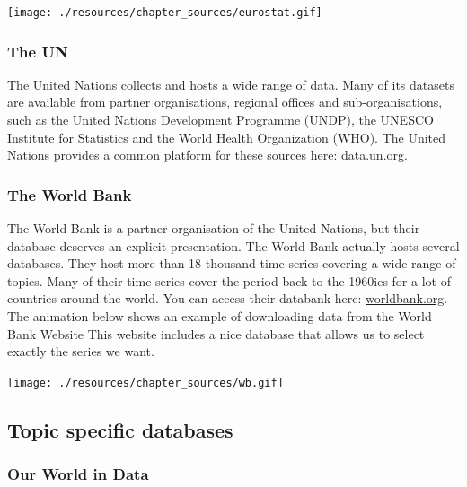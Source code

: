 \documentclass[
]{book}
\begin{document}
\texttt{[image: ./resources/chapter\_sources/eurostat.gif]}

\hypertarget{the-un}{%
\subsubsection*{The UN}\label{the-un}}

The United Nations collects and hosts a wide range of data. Many of its datasets are available from partner organisations, regional offices and sub-organisations, such as the United Nations Development Programme (UNDP), the UNESCO Institute for Statistics and the World Health Organization (WHO). The United Nations provides a common platform for these sources here: \href{http://data.un.org/Default.aspx}{data.un.org}.

\hypertarget{the-world-bank}{%
\subsubsection*{The World Bank}\label{the-world-bank}}

The World Bank is a partner organisation of the United Nations, but their database deserves an explicit presentation. The World Bank actually hosts several databases. They host more than 18 thousand time series covering a wide range of topics. Many of their time series cover the period back to the 1960ies for a lot of countries around the world. You can access their databank here: \href{http://worldbank.org}{worldbank.org}. The animation below shows an example of downloading data from the World Bank Website This website includes a nice database that allows us to select exactly the series we want.

\texttt{[image: ./resources/chapter\_sources/wb.gif]}

\hypertarget{topic-specific-databases}{%
\subsection*{Topic specific databases}\label{topic-specific-databases}}

\hypertarget{our-world-in-data}{%
\subsubsection*{Our World in Data}\label{our-world-in-data}}
\end{document}
